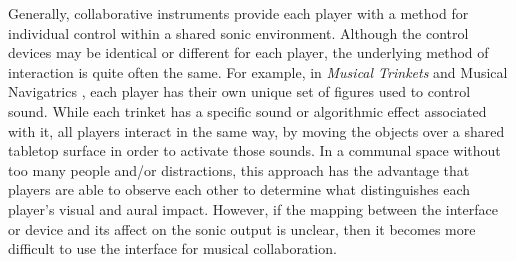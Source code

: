 Generally, collaborative instruments provide each player with a method for
individual control within a shared sonic environment.  Although the control
devices may be identical or different for each player, the underlying method of
interaction is quite often the same.  For example, in \textit{Musical Trinkets}
 \cite{Paradiso:2001} and Musical Navigatrics \cite{Pardue:2002}, each player has their own unique set of
figures used to control sound.  While each trinket has a specific sound or
algorithmic effect associated with it, all players interact in the same way, by
moving the objects over a shared tabletop surface in order to activate those
sounds. In a communal space without too many people and/or distractions, this
approach has the advantage that players are able to observe each other to
determine what distinguishes each player's visual and aural impact.  However, if
the mapping between the interface or device and its affect on the sonic output is
unclear, then it becomes more difficult to use the interface for musical
collaboration.


%
%

